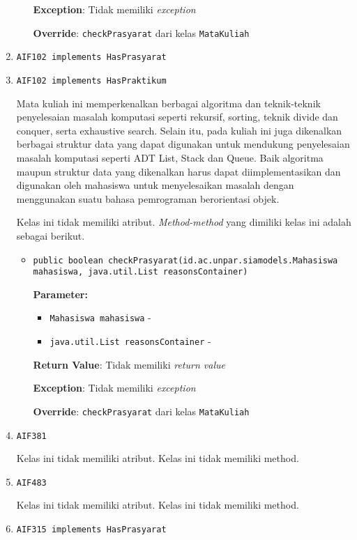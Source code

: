 \documentclass{article}
\begin{document}
\begin{enumerate}
\begin{itemize}
\textbf{Exception}: Tidak memiliki \textit{exception}

\textbf{Override}: \texttt{checkPrasyarat} dari kelas \texttt{MataKuliah}

\end{itemize}
\item \texttt{AIF102 implements HasPrasyarat}

\item \texttt{AIF102 implements HasPraktikum}

Mata kuliah ini memperkenalkan berbagai algoritma dan teknik-teknik 
 penyelesaian masalah komputasi seperti rekursif, sorting, teknik divide dan 
 conquer, serta exhaustive search. Selain itu, pada kuliah ini juga 
 dikenalkan berbagai struktur data yang dapat digunakan untuk mendukung 
 penyelesaian masalah komputasi seperti ADT List, Stack dan Queue. Baik 
 algoritma maupun struktur data yang dikenalkan harus dapat diimplementasikan 
 dan digunakan oleh mahasiswa untuk menyelesaikan masalah dengan menggunakan 
 suatu bahasa pemrograman berorientasi objek.

Kelas ini tidak memiliki atribut. \textit{Method-method} yang dimiliki kelas ini adalah sebagai berikut.
\begin{itemize}
\item \texttt{public boolean checkPrasyarat(id.ac.unpar.siamodels.Mahasiswa mahasiswa, java.util.List reasonsContainer)}

\textbf{Parameter:}
\begin{itemize}
\item \texttt{Mahasiswa mahasiswa} - 
\item \texttt{java.util.List reasonsContainer} - 
\end{itemize}
\textbf{Return Value}: Tidak memiliki \textit{return value}

\textbf{Exception}: Tidak memiliki \textit{exception}

\textbf{Override}: \texttt{checkPrasyarat} dari kelas \texttt{MataKuliah}

\end{itemize}
\item \texttt{AIF381}



Kelas ini tidak memiliki atribut. Kelas ini tidak memiliki method. \item \texttt{AIF483}



Kelas ini tidak memiliki atribut. Kelas ini tidak memiliki method. \item \texttt{AIF315 implements HasPrasyarat}


\end{enumerate}
\end{document}
